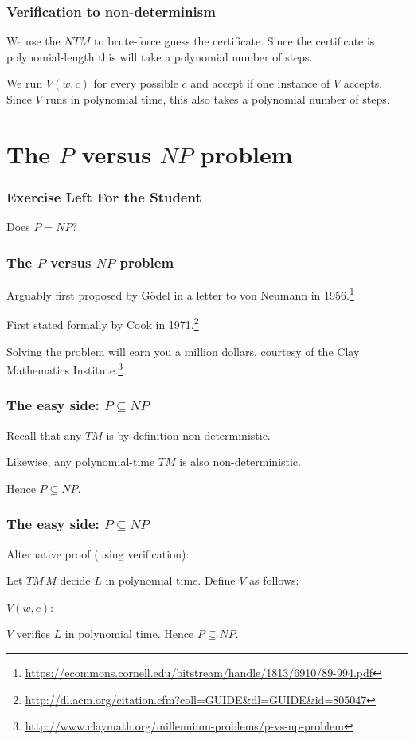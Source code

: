 \documentclass[aspectratio=169]{beamer}
\begin{document}
\begin{frame}
\frametitle{Verification to non-determinism}
We use the $NTM$ to brute-force guess the certificate. Since the certificate is polynomial-length this will take a polynomial number of steps.

We run $V(w, c)$ for every possible $c$ and accept if one instance of $V$ accepts. Since $V$ runs in polynomial time, this also takes a polynomial number of steps.
\end{frame}

\section{The $P$ versus $NP$ problem}

\begin{frame}
\frametitle{Exercise Left For the Student}
\centerline{Does $P=NP$?}
\end{frame}

\begin{frame}
\frametitle{The $P$ versus $NP$ problem}
Arguably first proposed by G\"{o}del in a letter to von Neumann in 1956.\footnote{\url{https://ecommons.cornell.edu/bitstream/handle/1813/6910/89-994.pdf}}

First stated formally by Cook in 1971.\footnote{\url{http://dl.acm.org/citation.cfm?coll=GUIDE&dl=GUIDE&id=805047}}

Solving the problem will earn you a million dollars, courtesy of the Clay Mathematics Institute.\footnote{\url{http://www.claymath.org/millennium-problems/p-vs-np-problem}}
\end{frame}

\begin{frame}
\frametitle{The easy side: $P \subseteq NP$}

Recall that any $TM$ is by definition non-deterministic.

Likewise, any polynomial-time $TM$ is also non-deterministic.

Hence $P \subseteq NP$.
\end{frame}

\begin{frame}
\frametitle{The easy side: $P \subseteq NP$}

Alternative proof (using verification):

Let $TM\, M$ decide $L$ in polynomial time. Define $V$ as follows:

\begin{algorithm}[H]
$V(w, c):$\\
\end{algorithm}

$V$ verifies $L$ in polynomial time. Hence $P \subseteq NP$.
\end{frame}
\end{document}
